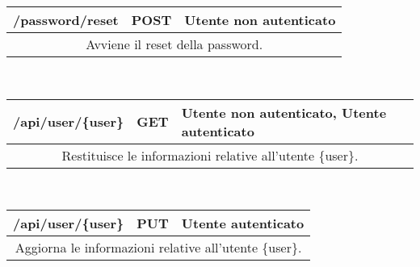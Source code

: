\begin{table}[h]
	\begin{tabular}{|p{}|p{}|p{}|}
		\toprule
		\textbf{/password/reset} & \textbf{POST} & \textbf{Utente non autenticato} \\ \midrule
		\multicolumn{3}{|c|}{Avviene il reset della password.} \\
		\bottomrule
	\end{tabular}\\
	\par\bigskip
	
	\begin{tabular}{|p{}|p{}|p{}|}
		\toprule
		\textbf{/api/user/\{user\}} & \textbf{GET} & \textbf{Utente non autenticato, Utente autenticato} \\ \midrule
		\multicolumn{3}{|c|}{Restituisce le informazioni relative all'utente \{user\}.} \\
		\bottomrule
	\end{tabular}\\
	\par\bigskip
	
	\begin{tabular}{|p{}|p{}|p{}|}
		\toprule
		\textbf{/api/user/\{user\}} & \textbf{PUT} & \textbf{Utente autenticato} \\ \midrule
		\multicolumn{3}{|c|}{Aggiorna le informazioni relative all'utente \{user\}.} \\
		\bottomrule
	\end{tabular}\\
	\par\bigskip
	
	
	
\end{table}
\newpage	
